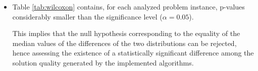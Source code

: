 \begin{itemize}

      



\item Table \ref{tab:wilcoxon} contains, for each analyzed problem instance, p-values considerably smaller than the significance level ($\alpha=0.05$). 

This implies that the null hypothesis corresponding to the equality of the median values of the differences of the two distributions can be rejected, hence assessing the existence of a statistically significant difference among the solution quality generated by the implemented algorithms.


\end{itemize}

